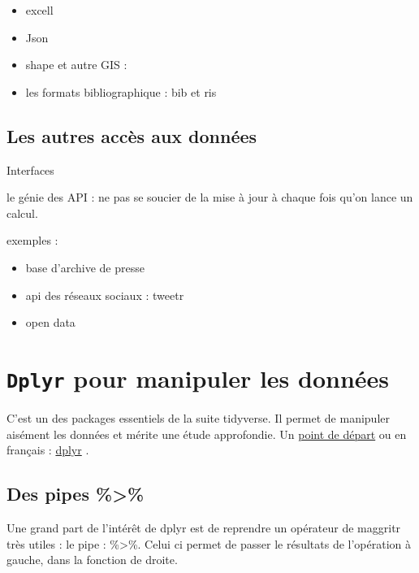 \documentclass[
]{book}
\providecommand{\tightlist}{%
  \setlength{\itemsep}{0pt}\setlength{\parskip}{0pt}}
\begin{document}
\begin{itemize}
\tightlist
\item
  excell
\item
  Json
\item
  shape et autre GIS :
\item
  les formats bibliographique : bib et ris
\end{itemize}

\hypertarget{les-autres-accuxe8s-aux-donnuxe9es}{%
\subsection{Les autres accès aux données}\label{les-autres-accuxe8s-aux-donnuxe9es}}

Interfaces

le génie des API : ne pas se soucier de la mise à jour à chaque fois qu'on lance un calcul.

exemples :

\begin{itemize}
\tightlist
\item
  base d'archive de presse
\item
  api des réseaux sociaux : tweetr
\item
  open data
\end{itemize}

\hypertarget{dplyr-pour-manipuler-les-donnuxe9es}{%
\section{\texorpdfstring{\texttt{Dplyr} pour manipuler les données}{Dplyr pour manipuler les données}}\label{dplyr-pour-manipuler-les-donnuxe9es}}

C'est un des packages essentiels de la suite tidyverse. Il permet de manipuler aisément les données et mérite une étude approfondie. Un \href{https://dplyr.tidyverse.org/articles/dplyr.html}{point de départ} ou en français : \href{http://larmarange.github.io/analyse-R/manipuler-les-donnees-avec-dplyr.html}{dplyr} .

\hypertarget{des-pipes}{%
\subsection{Des pipes \%\textgreater\%}\label{des-pipes}}

Une grand part de l'intérêt de dplyr est de reprendre un opérateur de maggritr très utiles : le pipe : \%\textgreater\%. Celui ci permet de passer le résultats de l'opération à gauche, dans la fonction de droite.
\end{document}
